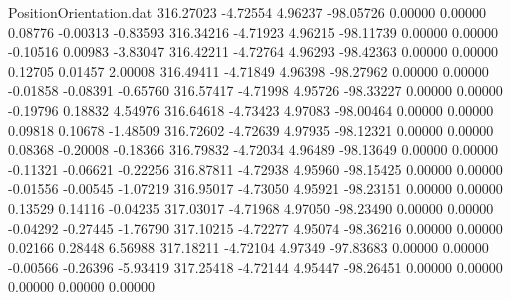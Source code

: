 \begin{filecontents}{PositionOrientation.dat}
 316.27023   -4.72554    4.96237   -98.05726    0.00000    0.00000    0.08776   -0.00313   -0.83593
 316.34216   -4.71923    4.96215   -98.11739    0.00000    0.00000   -0.10516    0.00983   -3.83047
 316.42211   -4.72764    4.96293   -98.42363    0.00000    0.00000    0.12705    0.01457    2.00008
 316.49411   -4.71849    4.96398   -98.27962    0.00000    0.00000   -0.01858   -0.08391   -0.65760
 316.57417   -4.71998    4.95726   -98.33227    0.00000    0.00000   -0.19796    0.18832    4.54976
 316.64618   -4.73423    4.97083   -98.00464    0.00000    0.00000    0.09818    0.10678   -1.48509
 316.72602   -4.72639    4.97935   -98.12321    0.00000    0.00000    0.08368   -0.20008   -0.18366
 316.79832   -4.72034    4.96489   -98.13649    0.00000    0.00000   -0.11321   -0.06621   -0.22256
 316.87811   -4.72938    4.95960   -98.15425    0.00000    0.00000   -0.01556   -0.00545   -1.07219
 316.95017   -4.73050    4.95921   -98.23151    0.00000    0.00000    0.13529    0.14116   -0.04235
 317.03017   -4.71968    4.97050   -98.23490    0.00000    0.00000   -0.04292   -0.27445   -1.76790
 317.10215   -4.72277    4.95074   -98.36216    0.00000    0.00000    0.02166    0.28448    6.56988
 317.18211   -4.72104    4.97349   -97.83683    0.00000    0.00000   -0.00566   -0.26396   -5.93419
 317.25418   -4.72144    4.95447   -98.26451    0.00000    0.00000    0.00000    0.00000    0.00000
\end{filecontents}
